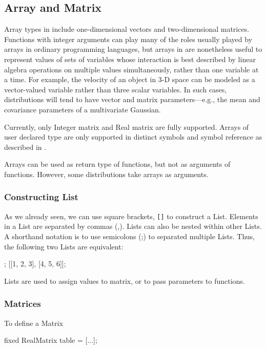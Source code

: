 \documentclass[12pt]{article}
\begin{document}
\subsection{Array and Matrix}\label{array-section}

Array types in \bl include one-dimensional vectors and two-dimensional
matrices. Functions with integer arguments can play many of the roles
usually played by arrays in ordinary programming languages, but arrays in
\bl are nonetheless useful to represent values of sets of variables
whose interaction is best described by linear algebra operations on
multiple values simultaneously, rather than one variable at a time.
For example, the velocity of an object in 3-D space can be modeled
as a vector-valued variable rather than three scalar variables.
In such cases, distributions will tend to have vector and matrix
parameters---e.g., the mean and covariance parameters of a
multivariate Gaussian.

Currently, only Integer matrix and Real matrix are fully
supported. Arrays of user declared type are only supported in distinct symbols and symbol reference as described in .

Arrays can be used as return type of functions, but not as arguments of functions. However, some distributions take arrays as arguments.

\subsubsection{Constructing List}\label{list-literal-section}
As we already seen, we can use square brackets, \texttt{[]} to construct a List. Elements in a List are separated by commas (,). Lists can also be nested within other Lists. A shorthand notation is to use semicolons (;) to separated multiple Lists.
Thus, the following two Lists are equivalent:
\begin{blogcode}
[1, 2, 3; 4, 5, 6];
[[1, 2, 3], [4, 5, 6]];
\end{blogcode}

Lists are used to assign values to matrix, or to pass parameters to functions.

\subsubsection{Matrices}\label{matrix-section}
To define a Matrix
\begin{blogcode}
fixed RealMatrix table = [...];
\end{blogcode}
\end{document}

